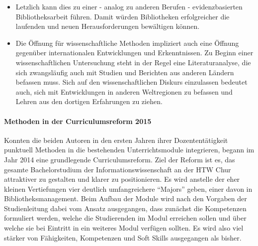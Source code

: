 \documentclass[a4paper,
fontsize=11pt,
oneside,
numbers=noperiodatend,
parskip=half-,
bibliography=totoc,
final
]{scrartcl}
\begin{document}
\begin{itemize}
  \begin{itemize}
  \itemsep1pt\parskip0pt
  \item
    und somit dazu beitragen, dass die bibliothekarische Arbeit
    qualitativ besser wird. Gleichzeitig würde so mehr Wissen produziert
    werden, das auch in den bibliothekswissenschaftlichen Diskurs
    einfliessen könnte.\footnote{Strukturell gesehen könnte damit die
      praxisorientierte Forschung, die bislang an den Fachhochschulen
      verortet wird, mehr in den Bibliotheken selber betrieben werden.
      Wäre eine ausreichende Forschungsfinanzierung gegeben, könnten die
      Fachhochschulen sich dann mit einer theoriegetriebenen Forschung
      befassen und somit den Wissensstand, auf dem praxisorientierte
      Forschung fussen soll, massiv erhöhen.}
  \end{itemize}
\item
  Letzlich kann dies zu einer - analog zu anderen Berufen -
  evidenzbasierten Bibliotheksarbeit führen. Damit würden Bibliotheken
  erfolgreicher die laufenden und neuen Herausforderungen bewältigen
  können.
\item
  Die Öffnung für wissenschaftliche Methoden impliziert auch eine
  Öffnung gegenüber internationalen Entwicklungen und Erkenntnissen. Zu
  Beginn einer wissenschaftlichen Untersuchung steht in der Regel eine
  Literaturanalyse, die sich zwangsläufig auch mit Studien und Berichten
  aus anderen Ländern befassen muss. Sich auf den wissenschaftlichen
  Diskurs einzulassen bedeutet auch, sich mit Entwicklungen in anderen
  Weltregionen zu befassen und Lehren aus den dortigen Erfahrungen zu
  ziehen.
\end{itemize}

\paragraph{Methoden in der Curriculumsreform
2015}\label{methoden-in-der-curriculumsreform-2015}

Konnten die beiden Autoren in den ersten Jahren ihrer Dozententätigkeit
punktuell Methoden in die bestehenden Unterrichtsmodule integrieren,
begann im Jahr 2014 eine grundlegende Curriculumsreform. Ziel der Reform
ist es, das gesamte Bachelorstudium der Informationswissenschaft an der
HTW Chur attraktiver zu gestalten und klarer zu positionieren. Es wird
anstelle der eher kleinen Vertiefungen vier deutlich umfangreichere
\enquote{Majors} geben, einer davon in Bibliotheksmanagement. Beim
Aufbau der Module wird nach den Vorgaben der Studienleitung dabei vom
Ansatz ausgegangen, dass zunächst die Kompetenzen formuliert werden,
welche die Studierenden im Modul erreichen sollen und über welche sie
bei Eintritt in ein weiteres Modul verfügen sollten. Es wird also viel
stärker von Fähigkeiten, Kompetenzen und Soft Skills ausgegangen als
bisher.
\end{document}
